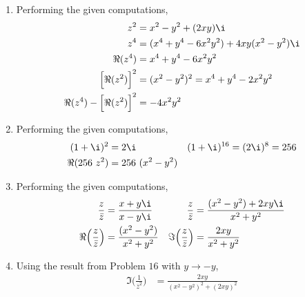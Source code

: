 \begin{enumerate}
    \item Performing the given computations,
          \begin{align}
              z^2                       & = x^2 - y^2 + (2xy)\i                 \\
              z^4                       & = (x^4 + y^4 - 6x^2y^2)
              + 4xy(x^2 - y^2) \i                                               \\
              \Re{(z^4)}                & = x^4 + y^4 - 6x^2y^2                 \\
              \Big[\Re{(z^2)}\Big]^2    & = (x^2 - y^2)^2 = x^4 + y^4 - 2x^2y^2 \\
              \Re{(z^4)}
              -  \Big[\Re{(z^2)}\Big]^2 & = -4x^2y^2
          \end{align}

    \item Performing the given computations,
          \begin{align}
              (1 + \i)^2      & = 2\i              &
              (1 + \i)^{16}   & = (2\i)^8 = 256      \\
              \Re{(256\ z^2)} & = 256\ (x^2 - y^2)
          \end{align}

    \item Performing the given computations,
          \begin{align}
              \frac{z}{\bar{z}}                  & = \frac{x + y\i}{x - y\i}    &
              \frac{z}{\bar{z}}                  & = \frac{(x^2 - y^2) + 2xy\i}
              {x^2 + y^2}                                                         \\
              \Re{\Big( \frac{z}{\bar{z}} \Big)} & = \frac{(x^2 - y^2)}
              {x^2 + y^2}                        &
              \Im{\Big( \frac{z}{\bar{z}} \Big)} & = \frac{2xy}
              {x^2 + y^2}
          \end{align}

    \item Using the result from Problem $ 16 $ with $ y \to -y $,
          \begin{align}
              \Im{ \Big( \frac{1}{\bar{z}^2} \Big)} & = \frac{2xy}{(x^2 - y^2)^2
                  + (2xy)^2}
          \end{align}


\end{enumerate}